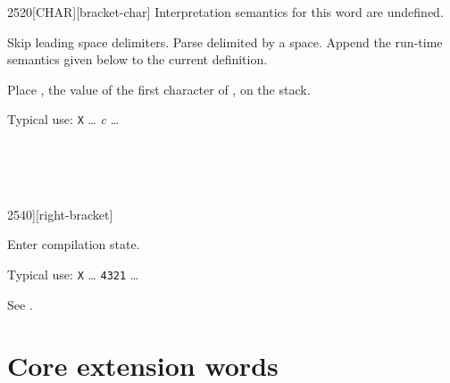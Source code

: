 \vspace*{-2ex}
\begin{worddef}{2520}{[CHAR]}[bracket-char]
\interpret
	Interpretation semantics for this word are undefined.

\compile

	Skip leading space delimiters. Parse  delimited
	by a space. Append the run-time semantics given below to the
	current definition.

\runtime

	Place , the value of the first character of
	, on the stack.


	\begin{rationale} %
		Typical use:
			\word{:} \texttt{X} {\ldots}
				\word{[CHAR]} \emph{c}
				{\ldots} \word{;}
	\end{rationale}

	\begin{testing} %
		 \\
		 \\
		 \\
	\end{testing}
\end{worddef}

\vspace*{-2ex}
\begin{worddef}{2540}{]}[right-bracket]
\item \stack{}{}

	Enter compilation state.

	\walso{core:[}

	\begin{rationale} %
		Typical use:
			\word{:} \texttt{X} {\ldots}
				\word{[} \texttt{4321} \word{]} 
				{\ldots} \word{;}
	\end{rationale}

	\begin{testing} %
		See \tref{core:[}{[}.
	\end{testing}
\end{worddef}


\section{Core extension words} %
\extended\vspace{1ex}

